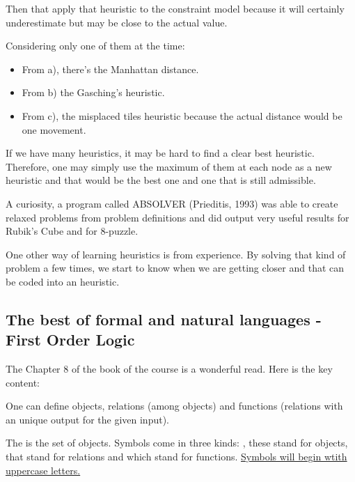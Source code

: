 Then that apply that heuristic to the constraint model because it will certainly underestimate but may be close to the actual value.



Considering only one of them at the time:
\begin{itemize}
    \item From a), there's the Manhattan distance.
    \item From b) the Gasching's heuristic.
    \item From c), the misplaced tiles heuristic because the actual distance would be one movement.
\end{itemize}




If we have many heuristics, it may be hard to find a clear best heuristic. Therefore, one may simply use the maximum of them at each node as a new heuristic and that would be the best one and one that is still admissible.



A curiosity, a program called ABSOLVER (Prieditis, 1993) was able to create relaxed problems from problem definitions and did output very useful results for Rubik's Cube and for 8-puzzle.


One other way of learning heuristics is from experience. By solving that kind of problem a few times, we start to know when we are getting closer and that can be coded into an heuristic.


\subsection{The best of formal and natural languages - First Order Logic}

The Chapter 8 of the book of the course is a wonderful read. Here is the key content:

One can define objects, relations (among objects) and functions (relations with an unique output for the given input).



The  is the set of objects. Symbols come in three kinds: , these stand for objects,  that stand for relations and  which stand for functions. \ul{Symbols will begin wtith uppercase letters.}



